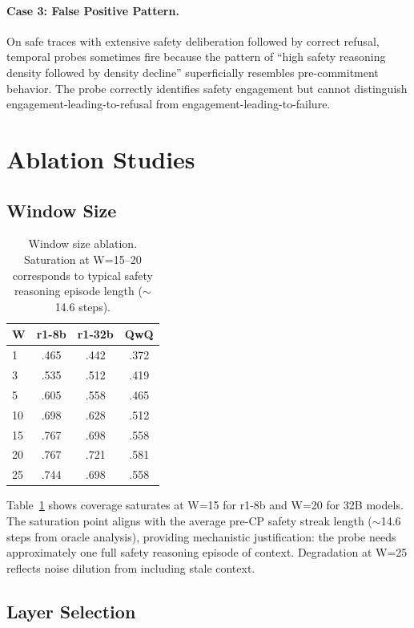 \documentclass[11pt,a4paper]{article}
\begin{document}
\paragraph{Case 3: False Positive Pattern.} On safe traces with extensive safety deliberation followed by correct refusal, temporal probes sometimes fire because the pattern of ``high safety reasoning density followed by density decline'' superficially resembles pre-commitment behavior. The probe correctly identifies safety engagement but cannot distinguish engagement-leading-to-refusal from engagement-leading-to-failure.

\section{Ablation Studies}

\subsection{Window Size}

\begin{table}[t]
\centering
\small
\begin{tabular}{lccc}
\toprule
W & r1-8b & r1-32b & QwQ \\
\midrule
1 & .465 & .442 & .372 \\
3 & .535 & .512 & .419 \\
5 & .605 & .558 & .465 \\
10 & .698 & .628 & .512 \\
15 & .767 & .698 & .558 \\
20 & .767 & .721 & .581 \\
25 & .744 & .698 & .558 \\
\bottomrule
\end{tabular}
\caption{Window size ablation. Saturation at W=15--20 corresponds to typical safety reasoning episode length ($\sim$14.6 steps).}
\label{tab:window}
\end{table}

Table~\ref{tab:window} shows coverage saturates at W=15 for r1-8b and W=20 for 32B models. The saturation point aligns with the average pre-CP safety streak length ($\sim$14.6 steps from oracle analysis), providing mechanistic justification: the probe needs approximately one full safety reasoning episode of context. Degradation at W=25 reflects noise dilution from including stale context.

\subsection{Layer Selection}
\end{document}
